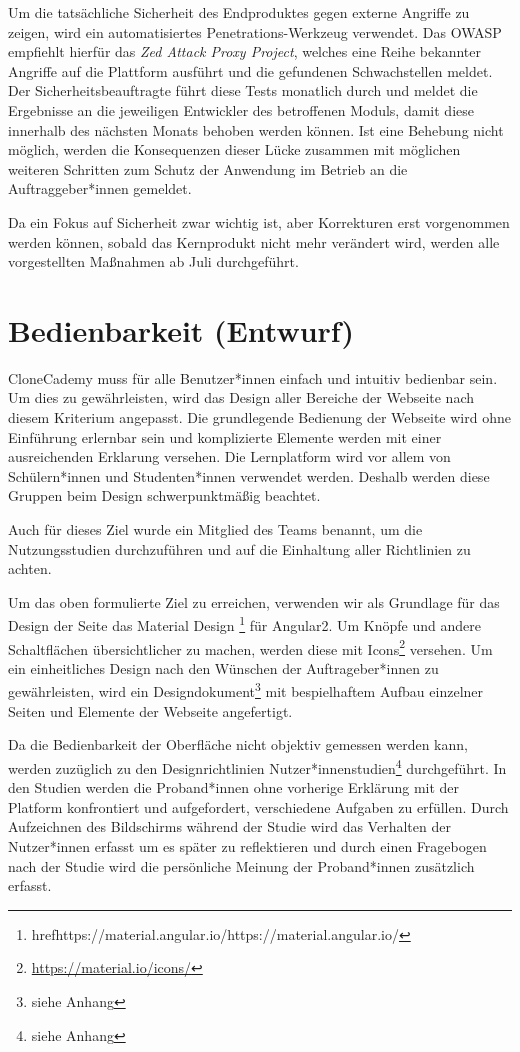 \documentclass[accentcolor=tud0b,12pt,paper=a4]{tudreport}
\begin{document}
Um die tatsächliche Sicherheit des Endproduktes gegen externe Angriffe zu zeigen, wird ein automatisiertes Penetrations-Werkzeug verwendet. Das OWASP empfiehlt hierfür das \emph{Zed Attack Proxy Project}, welches eine Reihe bekannter Angriffe auf die Plattform ausführt und die gefundenen Schwachstellen meldet. Der Sicherheitsbeauftragte führt diese Tests monatlich durch und meldet die Ergebnisse an die jeweiligen Entwickler des betroffenen Moduls, damit diese innerhalb des nächsten Monats behoben werden können. Ist eine Behebung nicht möglich, werden die Konsequenzen dieser Lücke zusammen mit möglichen weiteren Schritten zum Schutz der Anwendung im Betrieb an die Auftraggeber*innen gemeldet.

Da ein Fokus auf Sicherheit zwar wichtig ist, aber Korrekturen erst vorgenommen werden können, sobald das Kernprodukt nicht mehr verändert wird, werden alle vorgestellten Maßnahmen ab Juli durchgeführt.

\section{Bedienbarkeit (Entwurf)}
CloneCademy muss für alle Benutzer*innen einfach und intuitiv bedienbar sein. Um dies zu gewährleisten, wird das Design aller Bereiche der Webseite nach diesem Kriterium angepasst. Die grundlegende Bedienung der Webseite wird ohne Einführung erlernbar sein und komplizierte Elemente werden mit einer ausreichenden Erklarung versehen. Die Lernplatform wird vor allem von Schülern*innen und Studenten*innen verwendet werden. Deshalb werden diese Gruppen beim Design schwerpunktmäßig beachtet.

Auch für dieses Ziel wurde ein Mitglied des Teams benannt, um die Nutzungsstudien durchzuführen und auf die Einhaltung aller Richtlinien zu achten.

Um das oben formulierte Ziel zu erreichen, verwenden wir als Grundlage für das Design der Seite das Material Design \footnote{href{https://material.angular.io/}{https://material.angular.io/}} für Angular2. Um Knöpfe und andere Schaltflächen übersichtlicher zu machen, werden diese mit Icons\footnote{\href{https://material.io/icons/}{https://material.io/icons/}} versehen. Um ein einheitliches Design nach den Wünschen der Auftrageber*innen zu gewährleisten, wird ein Designdokument\footnote{siehe Anhang} mit bespielhaftem Aufbau einzelner Seiten und Elemente der Webseite angefertigt.


Da die Bedienbarkeit der Oberfläche nicht objektiv gemessen werden kann, werden zuzüglich zu den Designrichtlinien Nutzer*innenstudien\footnote{siehe Anhang} durchgeführt. In den Studien werden die Proband*innen ohne vorherige Erklärung mit der Platform konfrontiert und aufgefordert, verschiedene Aufgaben zu erfüllen. Durch Aufzeichnen des Bildschirms während der Studie wird das Verhalten der Nutzer*innen erfasst um es später zu reflektieren und durch einen Fragebogen nach der Studie wird die persönliche Meinung der Proband*innen zusätzlich erfasst.
\end{document}
